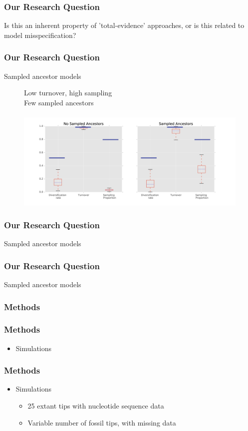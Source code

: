 \documentclass[]{beamer}
\begin{document}
\begin{frame}
\frametitle{Our Research Question}
Is this an inherent property of 'total-evidence' approaches, or is this related to model misspecification?
\end{frame}

\begin{frame}
\frametitle{Our Research Question}
Sampled ancestor models
\begin{figure}
Low turnover, high sampling  \\
Few sampled ancestors \\
\lambda   \mu   \psi   \rho \\
\includegraphics[scale=0.4]{images/HighTurnHighSamplog.png}
\end{figure}
\end{frame}

\begin{frame}
\frametitle{Our Research Question}
Sampled ancestor models
\end{frame}

\begin{frame}
\frametitle{Our Research Question}
Sampled ancestor models
\end{frame}

\begin{frame}
\frametitle{Methods}
\end{frame}

\begin{frame}
\frametitle{Methods}
\begin{itemize}
\item Simulations
\end{itemize}
\end{frame}

\begin{frame}
\frametitle{Methods}
\begin{itemize}
\item Simulations
\begin{itemize}
\item 25 extant tips with nucleotide sequence data
\item Variable number of fossil tips, with missing data
\end{itemize}
\end{itemize}
\end{frame}
\end{document}
